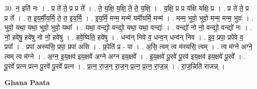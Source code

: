 \documentclass[17pt]{extarticle}
\begin{document}
30. न॒ इति॑ नः । . प्र ते॑ ते॒ प्र प्र ते᳚ । . ते॒ य॒क्षि॒ य॒क्षि॒ ते॒ ते॒ य॒क्षि॒ । . य॒क्षि॒ प्र प्र य॑क्षि यक्षि॒ प्र । . प्र ते॑ ते॒ प्र प्र ते᳚ । . त॒ इ॒य॒र्मी॒य॒र्मि॒ ते॒ त॒ इ॒य॒र्मि॒ । . इ॒य॒र्मि॒ मन्म॒ मन्मे॑ यर्मीयर्मि॒ मन्म॑ । . मन्म॒ भुवो॒ भुवो॒ मन्म॒ मन्म॒ भुवः॑ । . भुवो॒ यथा॒ यथा॒ भुवो॒ भुवो॒ यथा᳚ । . यथा॒ वन्द्यो॒ वन्द्यो॒ यथा॒ यथा॒ वन्द्यः॑ । . वन्द्यो॑ नो नो॒ वन्द्यो॒ वन्द्यो॑ नः । . नो॒ हवे॑षु॒ हवे॑षु नो नो॒ हवे॑षु । . हवे॒ष्विति॒ हवे॑षु । . धन्व॑न् निवे व॒ धन्व॒न् धन्व॑न् निव । . इ॒व॒ प्रपा॒ प्रपे॑वे व॒ प्रपा᳚ । . प्रपा॑ अस्यसि॒ प्रपा॒ प्रपा॑ असि । . प्र॒पेति॑ प्र - पा । . अ॒सि॒ त्वम् त्व म॑स्यसि॒ त्वम् । . त्व म॑ग्ने अग्ने॒ त्वम् त्व म॑ग्ने । . अ॒ग्न॒ इ॒य॒क्षव॑ इय॒क्षवे॑ अग्ने अग्न इय॒क्षवे᳚ । . इ॒य॒क्षवे॑ पू॒रवे॑ पू॒रव॑ इय॒क्षव॑ इय॒क्षवे॑ पू॒रवे᳚ । . पू॒रवे᳚ प्रत्न प्रत्न पू॒रवे॑ पू॒रवे᳚ प्रत्न । . प्र॒त्न॒ रा॒ज॒न् रा॒ज॒न् प्र॒त्न॒ प्र॒त्न॒ रा॒ज॒न्न् । . रा॒ज॒न्निति॑ राजन्न् । \newline

\textbf{Ghana Paata } \newline
\end{document}
